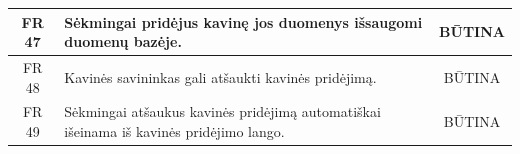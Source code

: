 \documentclass{VUMIFPSkursinis}
\begin{document}
\begin{center}
\begin{table}[H]
\begin{tabular}{|p{2cm}|p{}|p{}|}
	\hline
		\multicolumn{1}{|c|}{FR 47}&
		{Sėkmingai pridėjus kavinę jos duomenys išsaugomi duomenų bazėje.}&
		\multicolumn{1}{|c|}{BŪTINA}\\	

	\hline
		\multicolumn{1}{|c|}{FR 48}&
		{Kavinės savininkas gali atšaukti kavinės pridėjimą.}&
		\multicolumn{1}{|c|}{BŪTINA}\\	

	\hline
		\multicolumn{1}{|c|}{FR 49}&
		{Sėkmingai atšaukus kavinės pridėjimą automatiškai išeinama iš kavinės pridėjimo lango.}&
		\multicolumn{1}{|c|}{BŪTINA}\\	

	\hline
	
	
	
	\end{tabular}
	
	\label{table:KavinėsPridėjimas}		
	\end{table}

\end{center}
\end{document}
